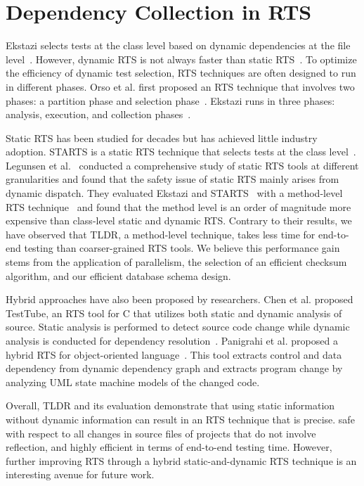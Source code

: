\section{Dependency Collection in RTS}
Ekstazi selects tests at the class level based on dynamic dependencies at the file level~\cite{ekstazi}.
However, dynamic RTS is not always faster than static RTS~\cite{faulttracer}. To optimize the efficiency of dynamic test selection, RTS techniques are often designed to run in different phases. Orso et al. first proposed an RTS technique that involves two phases: a partition phase and selection phase~\cite{b43}. Ekstazi runs in three phases: analysis, execution, and collection phases~\cite{ekstazi}. 

Static RTS has been studied for decades but has achieved little industry adoption. STARTS is a static RTS technique that selects tests at the class level~\cite{starts}. Legunsen et al.~\cite{b37} conducted a comprehensive study of static RTS tools at different granularities and found that the safety issue of static RTS mainly arises from dynamic dispatch. They evaluated Ekstazi and STARTS~\cite{starts} with a method-level RTS technique~\cite{legunsen2016extensive}
and found that the  method level is an order of magnitude more expensive than class-level static and dynamic RTS. Contrary to their results, we have observed that TLDR, a method-level technique, takes less time for end-to-end testing than coarser-grained RTS tools. We believe this performance gain stems from the application of parallelism, the selection of an efficient checksum algorithm, and our efficient database schema design.

Hybrid approaches have also been proposed by researchers. Chen et al. \cite{b40} proposed TestTube, an RTS tool for C that utilizes both static and dynamic analysis of source. Static analysis is performed to detect source code change while dynamic analysis is conducted for dependency resolution~\cite{b40}. Panigrahi et al. proposed a hybrid RTS for object-oriented language~\cite{panigrahi}. This tool extracts control and data dependency from dynamic dependency graph and extracts program change by analyzing UML state machine models of the changed code.

Overall, TLDR and its evaluation demonstrate that using static information without dynamic information can result in an RTS technique that is precise.  safe with respect to all changes in source files of projects that do not involve reflection, and highly efficient in terms of end-to-end testing time. 
However, further improving RTS through a hybrid static-and-dynamic RTS technique is an interesting avenue for future work.

\raggedbottom
